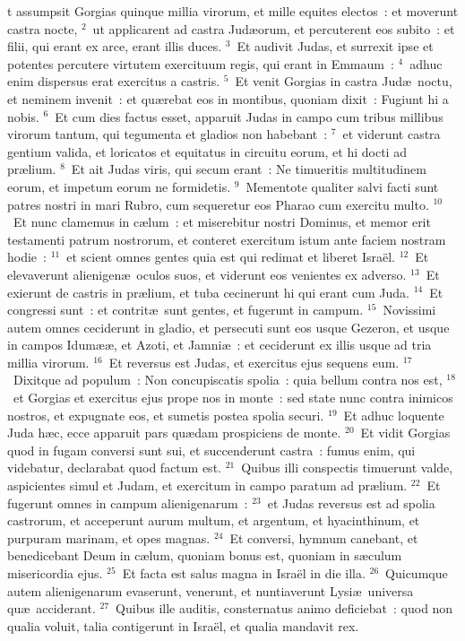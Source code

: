 \bchapter
{}t assumpsit Gorgias quinque millia virorum, et mille equites electos~: et moverunt castra nocte,
${}^{2}$~ut applicarent ad castra Jud\ae orum, et percuterent eos subito~: et filii, qui erant ex arce, erant illis duces.
${}^{3}$~Et audivit Judas, et surrexit ipse et potentes percutere virtutem exercituum regis, qui erant in Emmaum~:
${}^{4}$~adhuc enim dispersus erat exercitus a castris.
${}^{5}$~Et venit Gorgias in castra Jud\ae\ noctu, et neminem invenit~: et qu\ae rebat eos in montibus, quoniam dixit~: Fugiunt hi a nobis.
${}^{6}$~Et cum dies factus esset, apparuit Judas in campo cum tribus millibus virorum tantum, qui tegumenta et gladios non habebant~:
${}^{7}$~et viderunt castra gentium valida, et loricatos et equitatus in circuitu eorum, et hi docti ad pr\ae lium.
${}^{8}$~Et ait Judas viris, qui secum erant~: Ne timueritis multitudinem eorum, et impetum eorum ne formidetis.
${}^{9}$~Mementote qualiter salvi facti sunt patres nostri in mari Rubro, cum sequeretur eos Pharao cum exercitu multo.
${}^{10}$~Et nunc clamemus in c\ae lum~: et miserebitur nostri Dominus, et memor erit testamenti patrum nostrorum, et conteret exercitum istum ante faciem nostram hodie~:
${}^{11}$~et scient omnes gentes quia est qui redimat et liberet Isra\"el.
${}^{12}$~Et elevaverunt alienigen\ae\ oculos suos, et viderunt eos venientes ex adverso.
${}^{13}$~Et exierunt de castris in pr\ae lium, et tuba cecinerunt hi qui erant cum Juda.
${}^{14}$~Et congressi sunt~: et contrit\ae\ sunt gentes, et fugerunt in campum.
${}^{15}$~Novissimi autem omnes ceciderunt in gladio, et persecuti sunt eos usque Gezeron, et usque in campos Idum\ae \ae , et Azoti, et Jamni\ae~: et ceciderunt ex illis usque ad tria millia virorum.
${}^{16}$~Et reversus est Judas, et exercitus ejus sequens eum.
${}^{17}$~Dixitque ad populum~: Non concupiscatis spolia~: quia bellum contra nos est,
${}^{18}$~et Gorgias et exercitus ejus prope nos in monte~: sed state nunc contra inimicos nostros, et expugnate eos, et sumetis postea spolia securi.
${}^{19}$~Et adhuc loquente Juda h\ae c, ecce apparuit pars qu\ae dam prospiciens de monte.
${}^{20}$~Et vidit Gorgias quod in fugam conversi sunt sui, et succenderunt castra~: fumus enim, qui videbatur, declarabat quod factum est.
${}^{21}$~Quibus illi conspectis timuerunt valde, aspicientes simul et Judam, et exercitum in campo paratum ad pr\ae lium.
${}^{22}$~Et fugerunt omnes in campum alienigenarum~:
${}^{23}$~et Judas reversus est ad spolia castrorum, et acceperunt aurum multum, et argentum, et hyacinthinum, et purpuram marinam, et opes magnas.
${}^{24}$~Et conversi, hymnum canebant, et benedicebant Deum in c\ae lum, quoniam bonus est, quoniam in s\ae culum misericordia ejus.
${}^{25}$~Et facta est salus magna in Isra\"el in die illa.
${}^{26}$~Quicumque autem alienigenarum evaserunt, venerunt, et nuntiaverunt Lysi\ae\ universa qu\ae\ acciderant.
${}^{27}$~Quibus ille auditis, consternatus animo deficiebat~: quod non qualia voluit, talia contigerunt in Isra\"el, et qualia mandavit rex.


